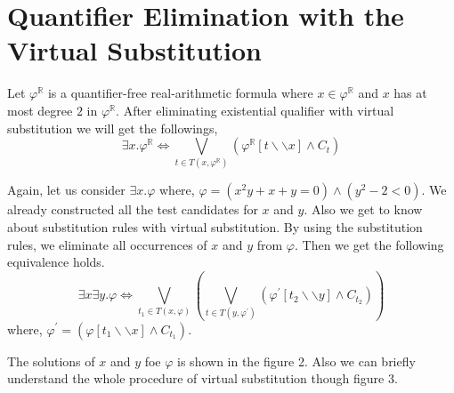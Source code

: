\section{Quantifier Elimination with the Virtual Substitution}
\label{sec:quantifier-elimination-with-the-virtual-substitution}
Let $\varphi^\mathbb{R}$ is a quantifier-free real-arithmetic formula where $x\in \varphi^\mathbb{R}$ and $x$ has at most degree $2$ in $\varphi^\mathbb{R}$. After eliminating existential qualifier with virtual substitution we will get the followings,
$$ \exists x. \varphi^\mathbb{R} \Longleftrightarrow \bigvee\limits_{t\in T(x,\varphi^\mathbb{R})}  (\varphi^\mathbb{R} [t\backslash\backslash x] \wedge C_t)$$

Again, let us consider $\exists x.\varphi$ where, $\varphi = (x^{2}y + x + y = 0) \wedge (y^{2} -2 < 0)$. We already constructed all the test candidates for $x$ and $y$. Also we get to know about substitution rules with virtual substitution. By using the substitution rules, we eliminate all occurrences of $x$ and $y$ from $\varphi$. Then we get the following equivalence holds.
$$ \exists x\exists y. \varphi \Longleftrightarrow \bigvee\limits_{t_{1}\in T(x,\varphi)}(\bigvee\limits_{t\in T(y,\varphi^{\prime})}  (\varphi^{\prime} [t_{2}\backslash\backslash y] \wedge C_{t_{2}}))$$
where, $\varphi^{\prime} = (\varphi [t_{1}\backslash\backslash x] \wedge C_{t_{1}})$.

The solutions of $x$ and $y$ foe $\varphi$ is shown in the figure 2. Also we can briefly understand the whole procedure of virtual substitution though figure 3.



